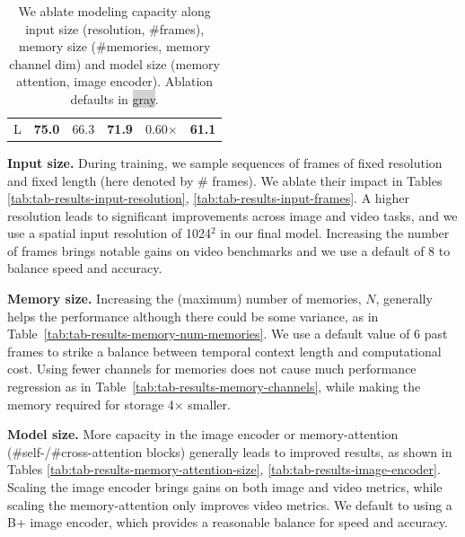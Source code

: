 \documentclass[]{fairmeta}
\renewcommand{\paragraph}[1]{\vspace{1.25mm}\noindent\textbf{#1}}
\newcommand{\x}{{\times}}
\def\x{$\times$}
\newcommand{\tabref}[1]{Table~\ref{#1}}
\renewcommand{\paragraph}[1]{\vspace{1.25mm}\noindent\textbf{#1}}
\begin{document}
\begin{table}[h!]
{\begin{minipage}{0.48\linewidth}
{\begin{center}
\begin{tabular}{cccccc}
                 L  &  \textbf{75.0} & 66.3 & \textbf{71.9} & 0.60\x & \textbf{61.1}\\
                \end{tabular}
            \end{center}
        }\end{minipage}
    }
    \vspace{-5pt}
    \caption{We ablate modeling capacity along input size (resolution, \#frames), memory size (\#memories, memory channel dim) and model size (memory attention, image encoder). Ablation defaults in \colorbox{lightgray}{gray}.}
    \vspace{1em}
    \vspace{-10pt}
\end{table}


\paragraph{Input size.} During training, we sample sequences of frames of fixed resolution  and fixed length (here denoted by \# frames). We ablate their impact in Tables \ref{tab:tab-results-input-resolution}, \ref{tab:tab-results-input-frames}. A higher resolution leads to significant improvements across image and video tasks, and we use a spatial input resolution of 1024$^2$ in our final model. Increasing the number of frames brings notable gains on video benchmarks and we use a default of 8 to balance speed and accuracy.






\paragraph{Memory size.} Increasing the (maximum) number of memories, $N$, generally helps the performance although there could be some variance, as in \tabref{tab:tab-results-memory-num-memories}. We use a default value of 6 past frames to strike a balance between temporal context length and computational cost. Using fewer channels for memories does not cause much performance regression as in \tabref{tab:tab-results-memory-channels}, while making the memory required for storage 4$\times$ smaller.






\paragraph{Model size.} More capacity in the image encoder or memory-attention (\#self-/\#cross-attention blocks) generally leads to improved results, as shown in Tables \ref{tab:tab-results-memory-attention-size}, \ref{tab:tab-results-image-encoder}. Scaling the image encoder brings gains on both image and video metrics, while scaling the memory-attention only improves video metrics. We default to using a B+ image encoder, which provides a reasonable balance for speed and accuracy.
\end{document}
